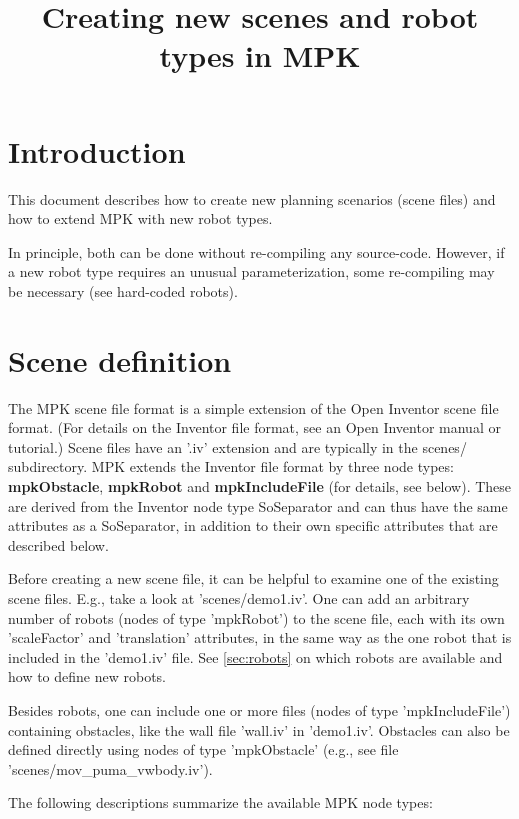 \documentclass[letter,12pt]{article}
\begin{document}
\title{Creating new scenes and robot types in MPK}
\maketitle


\section{Introduction}

This document describes how to create new planning scenarios (scene
files) and how to extend MPK with new robot types.  

In principle, both can be done without re-compiling any source-code.
However, if a new robot type requires an unusual parameterization, some
re-compiling may be necessary (see hard-coded robots).


\section{Scene definition}
\label{sec:scenes}

The MPK scene file format is a simple extension of the Open Inventor
scene file format.  (For details on the Inventor file format, see an
Open Inventor manual or tutorial.)  Scene files have an '.iv'
extension and are typically in the scenes/ subdirectory.  MPK extends
the Inventor file format by three node types: {\bf mpkObstacle}, {\bf
  mpkRobot} and {\bf mpkIncludeFile} (for details, see below).  These
are derived from the Inventor node type SoSeparator and can thus have
the same attributes as a SoSeparator, in addition to their own
specific attributes that are described below.

Before creating a new scene file, it can be helpful to examine one of
the existing scene files.  E.g., take a look at 'scenes/demo1.iv'.
One can add an arbitrary number of robots (nodes of type 'mpkRobot')
to the scene file, each with its own 'scaleFactor' and 'translation'
attributes, in the same way as the one robot that is included in the
'demo1.iv' file.  See \ref{sec:robots} on which robots are available
and how to define new robots.

Besides robots, one can include one or more files (nodes of type
'mpkIncludeFile') containing obstacles, like the wall file 'wall.iv'
in 'demo1.iv'.  Obstacles can also be defined directly using nodes of
type 'mpkObstacle' (e.g., see file 'scenes/mov\_puma\_vwbody.iv').

The following descriptions summarize the available MPK node types:
\end{document}
